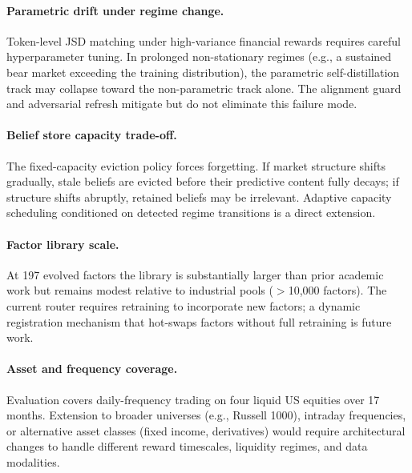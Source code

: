 \paragraph{Parametric drift under regime change.} Token-level JSD matching under high-variance financial rewards requires careful hyperparameter tuning. In prolonged non-stationary regimes (e.g., a sustained bear market exceeding the training distribution), the parametric self-distillation track may collapse toward the non-parametric track alone. The alignment guard and adversarial refresh mitigate but do not eliminate this failure mode.

\paragraph{Belief store capacity trade-off.} The fixed-capacity eviction policy forces forgetting. If market structure shifts gradually, stale beliefs are evicted before their predictive content fully decays; if structure shifts abruptly, retained beliefs may be irrelevant. Adaptive capacity scheduling conditioned on detected regime transitions is a direct extension.

\paragraph{Factor library scale.} At 197 evolved factors the library is substantially larger than prior academic work but remains modest relative to industrial pools ($>$10,000 factors). The current router requires retraining to incorporate new factors; a dynamic registration mechanism that hot-swaps factors without full retraining is future work.

\paragraph{Asset and frequency coverage.} Evaluation covers daily-frequency trading on four liquid US equities over 17 months. Extension to broader universes (e.g., Russell 1000), intraday frequencies, or alternative asset classes (fixed income, derivatives) would require architectural changes to handle different reward timescales, liquidity regimes, and data modalities.

